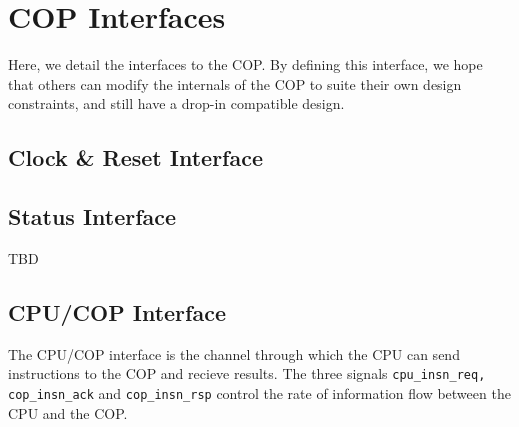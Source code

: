 \documentclass{article}
\begin{document}
\section{COP Interfaces}
\label{sec:cop-interfaces}

Here, we detail the interfaces to the COP. By defining this interface, we
hope that others can modify the internals of the COP to suite their own
design constraints, and still have a drop-in compatible design.

\subsection{Clock \& Reset Interface}




\subsection{Status Interface}

TBD

\subsection{CPU/COP Interface}

The CPU/COP interface is the channel through which the CPU can send
instructions to the COP and recieve results. The three signals
{\tt cpu\_insn\_req, cop\_insn\_ack} and {\tt cop\_insn\_rsp} control the
rate of information flow between the CPU and the COP.
\end{document}
